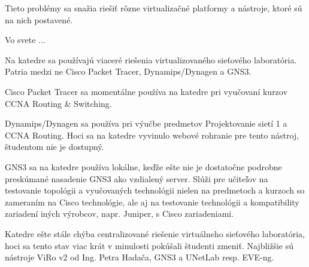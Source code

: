 Tieto problémy sa snažia riešiť rôzne virtualizačné platformy a nástroje, ktoré sú na nich postavené.

Vo svete ...

Na katedre sa používajú viaceré riešenia virtualizovaného sieťového laboratória. Patria medzi ne Cisco Packet Tracer, Dynamips/Dynagen a GNS3.

Cisco Packet Tracer sa momentálne používa na katedre pri vyučovaní kurzov CCNA Routing \& Switching. 

Dynamips/Dynagen sa používa pri výučbe predmetov Projektovanie sietí 1 a CCNA Routing. Hoci sa na katedre vyvinulo webové rohranie pre tento nástroj, študentom nie je dostupný.

GNS3 sa na katedre používa lokálne, keďže ešte nie je dostatočne podrobne preskúmané nasadenie GNS3 ako vzdialený server. Slúži pre učiteľov na testovanie topológii a vyučovaných technológii nielen na predmetoch a kurzoch so zameraním na Cisco technológie, ale aj na testovanie technológii a kompatibility zariadení iných výrobcov, napr. Juniper, s Cisco zariadeniami.

Katedre ešte stále chýba centralizované riešenie virtuálneho sieťového laboratória, hoci sa tento stav viac krát v minulosti pokúšali študenti zmeniť. Najbližšie sú nástroje ViRo v2 od Ing. Petra Hadača, GNS3 a UNetLab resp. EVE-ng.